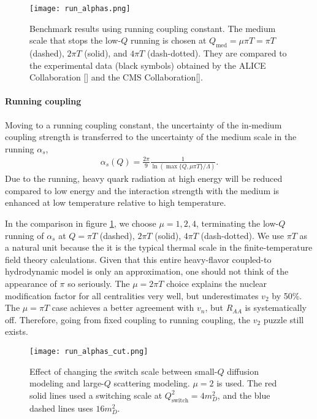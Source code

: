 \begin{figure}
\centering
\texttt{[image: run\_alphas.png]}
\caption{Benchmark results using running coupling constant. The medium scale that stops the low-$Q$ running is chosen at $Q_{\textrm{med}} = \mu\pi T = \pi T$ (dashed), $2\pi T$ (solid), and $4\pi T$ (dash-dotted). They are compared to the experimental data (black symbols) obtained by the ALICE Collaboration [] and the CMS Collaboration[].}
\label{fig:new:run-a}
\end{figure}

\paragraph{Running coupling} Moving to a running coupling constant, the uncertainty of the in-medium coupling strength is transferred to the uncertainty of the medium scale in the running $\alpha_s$,
\begin{eqnarray}
\alpha_s(Q) = \frac{2\pi}{9}\frac{1}{\ln \left( \max\{Q, \mu\pi T\} / \Lambda\right)}.
\end{eqnarray}
Due to the running, heavy quark radiation at high energy will be reduced compared to low energy and the interaction strength with the medium is enhanced at low temperature relative to high temperature.

In the comparison in figure \ref{fig:new:run-a}, we choose $\mu = 1, 2, 4$, terminating the low-$Q$ running of $\alpha_s$ at $Q = \pi T$ (dashed), $2\pi T$ (solid), $4\pi T$ (dash-dotted).
We use $\pi T$ as a natural unit because the it is the typical thermal scale in the finite-temperature field theory calculations.
Given that this entire heavy-flavor coupled-to hydrodynamic model is only an approximation, one should not think of the appearance of $\pi$ so seriously.
The $\mu=2\pi T$ choice explains the nuclear modification factor for all centralities very well, but underestimates $v_2$ by 50\%.
The $\mu=\pi T$ case achieves a better agreement with $v_n$, but $R_{AA}$ is systematically off.
Therefore, going from fixed coupling to running coupling, the $v_2$ puzzle still exists.

\begin{figure}
\centering
\texttt{[image: run\_alphas\_cut.png]}
\caption{Effect of changing the switch scale between small-$Q$ diffusion modeling and large-$Q$ scattering modeling. $\mu=2$ is used. The red solid lines used a switching scale at $Q_{\textrm{switch}}^2 = 4 m_D^2$, and the blue dashed lines uses $16 m_D^2$.}
\label{fig:new:run-cut}
\end{figure}
